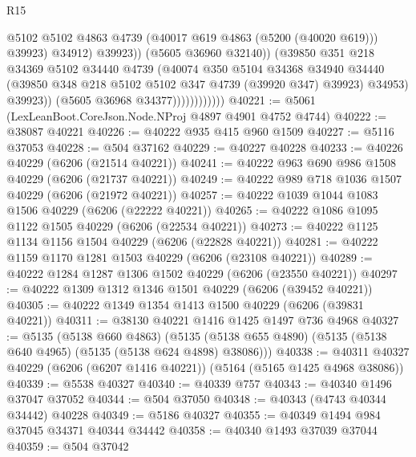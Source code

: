 \begin{lexlean}{R15}
\begin{coremodule}
{{{{{{{{{{{                                      @5102
                                      @5102
                                      @4863
                                      @4739
                                      (@40017 @619 @4863 (@5200 (@40020 @619)))
                                      @39923)
                                    @34912)
                                  @39923))
                              (@5605 @36960 @32140))
                            (@39850
                              @351
                              @218
                              @34369
                              @5102
                              @34440
                              @4739
                              (@40074
                                @350
                                @5104
                                @34368
                                @34940
                                @34440
                                (@39850 @348 @218 @5102 @5102 @347 @4739 (@39920 @347) @39923)
                                @34953)
                              @39923))
                          (@5605 @36968 @34377))))))))))))
@40221 := @5061 (LexLeanBoot.CoreJson.Node.NProj @4897 @4901 @4752 @4744)
@40222 := @38087 @40221
@40226 := @40222 @935 @415 @960 @1509
@40227 := @5116 @37053
@40228 := @504 @37162
@40229 := @40227 @40228
@40233 := @40226 @40229 (@6206 (@21514 @40221))
@40241 := @40222 @963 @690 @986 @1508 @40229 (@6206 (@21737 @40221))
@40249 := @40222 @989 @718 @1036 @1507 @40229 (@6206 (@21972 @40221))
@40257 := @40222 @1039 @1044 @1083 @1506 @40229 (@6206 (@22222 @40221))
@40265 := @40222 @1086 @1095 @1122 @1505 @40229 (@6206 (@22534 @40221))
@40273 := @40222 @1125 @1134 @1156 @1504 @40229 (@6206 (@22828 @40221))
@40281 := @40222 @1159 @1170 @1281 @1503 @40229 (@6206 (@23108 @40221))
@40289 := @40222 @1284 @1287 @1306 @1502 @40229 (@6206 (@23550 @40221))
@40297 := @40222 @1309 @1312 @1346 @1501 @40229 (@6206 (@39452 @40221))
@40305 := @40222 @1349 @1354 @1413 @1500 @40229 (@6206 (@39831 @40221))
@40311 := @38130 @40221 @1416 @1425 @1497 @736 @4968
@40327 := @5135
    (@5138 @660 @4863)
    (@5135 (@5138 @655 @4890) (@5135 (@5138 @640 @4965) (@5135 (@5138 @624 @4898) @38086)))
@40338 := @40311 @40327 @40229 (@6206 (@6207 @1416 @40221)) (@5164 (@5165 @1425 @4968 @38086))
@40339 := @5538 @40327
@40340 := @40339 @757
@40343 := @40340 @1496 @37047 @37052
@40344 := @504 @37050
@40348 := @40343 (@4743 @40344 @34442) @40228
@40349 := @5186 @40327
@40355 := @40349 @1494 @984 @37045 @34371 @40344 @34442
@40358 := @40340 @1493 @37039 @37044
@40359 := @504 @37042
}}}}}}}}}}}
\end{coremodule}
\end{lexlean}

